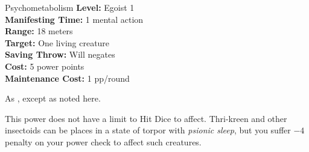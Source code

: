 {Psychometabolism}
{
	\textbf{Level:}
	Egoist 1\\
	\textbf{Manifesting Time:}
	1 mental action\\
	\textbf{Range:}
	18 meters\\
	\textbf{Target:}
	One living creature\\
	\textbf{Saving Throw:}
	Will negates\\
	\textbf{Cost:}
	5 power points\\
	\textbf{Maintenance Cost:}
	1 pp/round\\
}
{
	As , except as noted here.

	This power does not have a limit to Hit Dice to affect. Thri-kreen and other insectoids can be places in a state of torpor with \emph{psionic sleep}, but you suffer $-4$ penalty on your power check to affect such creatures.
}